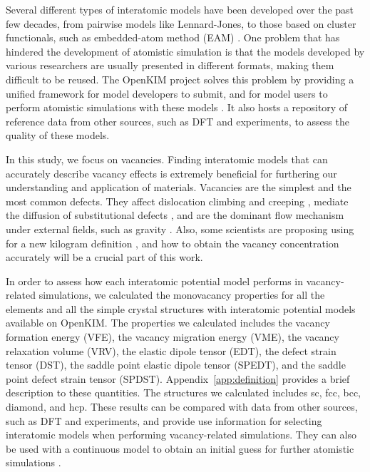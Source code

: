\documentclass[%
 reprint,
 amsmath,amssymb,
 aps,
]{revtex4-1}
\begin{document}
Several different types of interatomic models have been developed over the past few decades, from pairwise models like Lennard-Jones, to those based on cluster functionals, such as embedded-atom method (EAM) \cite{daw1993embedded, daw1984embedded}.
One problem that has hindered the development of atomistic simulation is that the models developed by various researchers are usually presented in different formats, making them difficult to be reused.
The OpenKIM project \cite{bierbaum2014openkim, openkim2016} solves this problem by providing a unified framework for model developers to submit, and for model users to perform atomistic simulations with these models \cite{tadmor2011potential}.
It also hosts a repository of reference data from other sources, such as DFT and experiments, to assess the quality of these models.

In this study, we focus on vacancies.
Finding interatomic models that can accurately describe vacancy effects is extremely beneficial for furthering our understanding and application of materials.
Vacancies are the simplest and the most common defects.
They affect dislocation climbing and creeping \cite{weertman1955theory}, mediate the diffusion of substitutional defects \cite{fahey1989point}, and are the dominant flow mechanism under external fields, such as gravity \cite{sethna2014flow}.
Also, some scientists are proposing using  for a new kilogram definition \cite{andreas2011counting}, and how to obtain the vacancy concentration accurately will be a crucial part of this work.

In order to assess how each interatomic potential model performs in vacancy-related simulations, we calculated the monovacancy properties for all the elements and all the simple crystal structures with interatomic potential models available on OpenKIM.
The properties we calculated includes the vacancy formation energy (VFE), the vacancy migration energy (VME), the vacancy relaxation volume (VRV), the elastic dipole tensor (EDT), the defect strain tensor (DST), the saddle point elastic dipole tensor (SPEDT), and the saddle point defect strain tensor (SPDST).
Appendix~\ref{app:definition} provides a brief description to these quantities.
The structures we calculated includes sc, fcc, bcc, diamond, and hcp.
These results can be compared with data from other sources, such as DFT and experiments, and provide use information for selecting interatomic models when performing vacancy-related simulations.
They can also be used with a continuous model to obtain an initial guess for further atomistic simulations \cite{bozhevolnyi2001multiple}.
\end{document}
